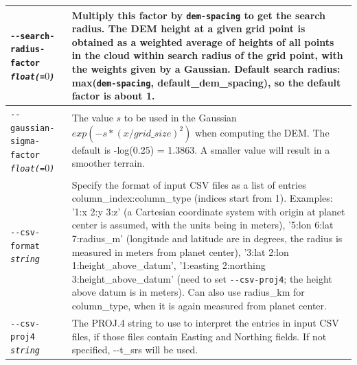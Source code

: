 \begin{longtable}{|p{8cm}|p{9cm}|}
\texttt{-\/-search-radius-factor \textit{float(=$0$)}} & Multiply this factor by \texttt{dem-spacing} to get the search radius. The DEM height at a given grid point is obtained as a weighted average of heights of all points in the cloud within search radius of the grid point, with the weights given by a Gaussian. Default search radius: max(\texttt{dem-spacing}, default\_dem\_spacing), so the default factor is about 1.\\ \hline

\texttt{-\/-gaussian-sigma-factor \textit{float(=$0$)}} & The value $s$ to be used in the Gaussian $exp(-s*(x/grid\_size)^2)$ when computing the DEM. The default is -log(0.25) = 1.3863. A smaller value will result in a smoother terrain. \\ \hline
 
\texttt{-\/-csv-format \textit{string}} & Specify the format of input
CSV files as a list of entries column\_index:column\_type (indices start
from 1). Examples: '1:x 2:y 3:z' (a Cartesian coordinate system with
origin at planet center is assumed, with the units being in meters),
'5:lon 6:lat 7:radius\_m' (longitude and latitude are in degrees, the
radius is measured in meters from planet center), '3:lat 2:lon
1:height\_above\_datum', '1:easting 2:northing 3:height\_above\_datum'
(need to set \texttt{-\/-csv-proj4}; the height above datum is in
meters). Can also use radius\_km for column\_type, when it is again
measured from planet center. \\ \hline

\texttt{-\/-csv-proj4 \textit{string}} & The PROJ.4 string to use to
interpret the entries in input CSV files, if those files contain Easting
and Northing fields. If not specified, -\/-t\_srs will be used.  \\
\hline


\end{longtable}
